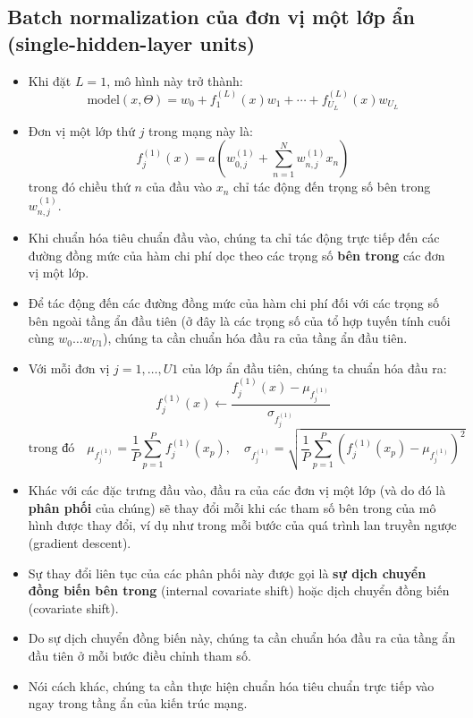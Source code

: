 \documentclass{book}
\begin{document}
    \subsection{Batch normalization của đơn vị một lớp ẩn (single-hidden-layer units)}
    \begin{itemize}
        \item Khi đặt $L=1$, mô hình này trở thành:
        \[
        \text{model}(x, \Theta) = w_0 + f^{(L)}_1(x) w_1 + \cdots + f^{(L)}_{U_L}(x) w_{U_L}
        \]
        \item Đơn vị một lớp thứ $j$ trong mạng này là:
        \[
        f^{(1)}_j(x) = a\left(w^{(1)}_{0,j} + \sum_{n=1}^{N} w^{(1)}_{n,j} x_n \right)
        \]
        trong đó chiều thứ $n$ của đầu vào $x_n$ chỉ tác động đến trọng số bên trong $w^{(1)}_{n,j}$.
        \item Khi chuẩn hóa tiêu chuẩn đầu vào, chúng ta chỉ tác động trực tiếp đến các đường đồng mức của hàm chi phí dọc theo các trọng số \textbf{bên trong} các đơn vị một lớp.
        \item Để tác động đến các đường đồng mức của hàm chi phí đối với các trọng số bên ngoài tầng ẩn đầu tiên (ở đây là các trọng số của tổ hợp tuyến tính cuối cùng $w_0 \dots w_{U1}$), chúng ta cần chuẩn hóa đầu ra của tầng ẩn đầu tiên.
        \item Với mỗi đơn vị $j=1,\dots,U1$ của lớp ẩn đầu tiên, chúng ta chuẩn hóa đầu ra:
        \[
        f^{(1)}_j(x) \leftarrow \frac{f^{(1)}_j(x) - \mu_{f^{(1)}_j}}{\sigma_{f^{(1)}_j}}
        \]
        \[
        \text{trong đó} \quad 
        \mu_{f^{(1)}_j} = \frac{1}{P} \sum_{p=1}^{P} f^{(1)}_j(x_{p}), \quad
        \sigma_{f^{(1)}_j} = \sqrt{ \frac{1}{P} \sum_{p=1}^{P} \left(f^{(1)}_j(x_{p}) - \mu_{f^{(1)}_j} \right)^2 }
        \]
        \item Khác với các đặc trưng đầu vào, đầu ra của các đơn vị một lớp (và do đó là \textbf{phân phối} của chúng) sẽ thay đổi mỗi khi các tham số bên trong của mô hình được thay đổi, ví dụ như trong mỗi bước của quá trình lan truyền ngược (gradient descent).
        \item Sự thay đổi liên tục của các phân phối này được gọi là \textbf{sự dịch chuyển đồng biến bên trong} (internal covariate shift) hoặc dịch chuyển đồng biến (covariate shift).
        \item Do sự dịch chuyển đồng biến này, chúng ta cần chuẩn hóa đầu ra của tầng ẩn đầu tiên ở mỗi bước điều chỉnh tham số.
        \item Nói cách khác, chúng ta cần thực hiện chuẩn hóa tiêu chuẩn trực tiếp vào ngay trong tầng ẩn của kiến trúc mạng.
    \end{itemize}
\end{document}
